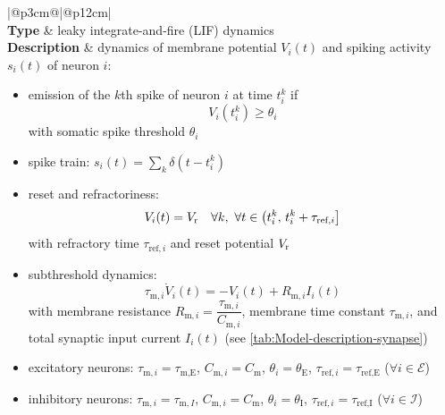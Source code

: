 \documentclass[10pt,a4paper,twoside,american]{article}
\newcommand{\Epop}{\mathcal{E}} %
\newcommand{\Ipop}{\mathcal{I}} %
\newcommand{\Vreset}{V_\textnormal{r}}
\begin{document}
\begin{table}[ht!]
\begin{tabular}{|@{\hspace*{1mm}}p{3cm}@{}|@{\hspace*{1mm}}p{12cm}|}
  \hline 
  \\
  \hline
  \textbf{Type} & leaky integrate-and-fire (LIF) dynamics \\
  \hline
    \textbf{Description} & dynamics of membrane potential $V_{i}(t)$  and spiking activity $s_i(t)$ of neuron $i$:                
            \begin{itemize}
              \item emission of the $k$th spike of neuron $i$ at time $t_{i}^{k}$ if
                \begin{equation}
                  V_{i}(t_{i}^{k})\geq\theta_i %
                \end{equation}
                 with somatic spike threshold $\theta_i$
              \item spike train: $s_i(t)=\sum_k\delta(t-t_i^k)$
              \item reset and refractoriness:
                \begin{equation*}
                  V_{i}(t)=\Vreset
                    \quad \forall{}k,\ \forall t \in \left(t_{i}^{k},\,t_{i}^{k}+\tau_{\text{ref},i}\right]
                \end{equation*}
                with refractory time $\tau_{\text{ref},i}$ and reset potential $\Vreset$
              \item subthreshold dynamics:
                \begin{equation}
                  \label{eq:lif}
                  \tau_{\text{m},i}\dot{V}_i(t)=-V_i(t)+R_{\text{m},i} I_i(t)
                \end{equation}
                with membrane resistance $R_{\text{m},i}=\dfrac{\tau_{\text{m},i}}{C_{\text{m},i}}$, membrane time constant $\tau_{\text{m},i}$, and total synaptic input current $I_i(t)$ (see \cref{tab:Model-description-synapse})
              \item excitatory neurons: $\tau_{\text{m},i}=\tau_\text{m,E}$, $C_{\text{m},i}=C_\text{m}$, $\theta_i=\theta_\text{E}$, $\tau_{\text{ref},i}=\tau_\text{ref,E}$ ($\forall i\in\Epop$)
              \item inhibitory neurons: $\tau_{\text{m},i}=\tau_{\text{m},I}$, $C_{\text{m},i}=C_\text{m}$, $\theta_i=\theta_\text{I}$, $\tau_{\text{ref},i}=\tau_\text{ref,I}$ ($\forall i\in\Ipop$)       
   
            \end{itemize}\\
              \hline 
\end{tabular}
\caption{Description of the neuron model. Parameter values are given in \cref{tab:Model-parameters}.}
\label{tab:Model-description-neuron}
\end{table}
\end{document}
